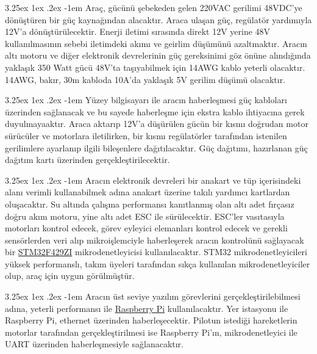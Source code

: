 \documentclass[12pt]{article}
\makeatletter
\newcounter{subsubsubsection}[subsubsection]
\renewcommand\paragraph{\@startsection{paragraph}{5}{\z@}%
  {3.25ex \@plus1ex \@minus.2ex}%
  {-1em}%
  {\normalfont\normalsize\bfseries}}
\makeatother
\begin{document}

\paragraph{} Araç, gücünü şebekeden gelen 220VAC gerilimi 48VDC'ye dönüştüren bir güç kaynağından alacaktır. Araca ulaşan güç, regülatör yardımıyla 12V'a dönüştürülecektir. Enerji iletimi sırasında direkt 12V yerine 48V kullanılmasının sebebi iletimdeki akımı ve geirlim düşümünü azaltmaktır. Aracın altı motoru ve diğer elektronik devrelerinin güç gereksinimi göz önüne alındığında yaklaşık 350 Watt gücü 48V'ta taşıyabilmek için 14AWG kablo yeterli olacaktır. 14AWG, bakır, 30m kabloda 10A'da yaklaşık 5V gerilim düşümü olacaktır. 

\paragraph{}Yüzey bilgisayarı ile aracın haberleşmesi güç kabloları üzerinden sağlanacak ve bu sayede haberleşme için ekstra kablo ihtiyacına gerek duyulmayaaktır. Araca aktarıp 12V'a düşürülen gücün bir kısmı doğrudan motor sürücüler ve motorlara iletilirken, bir kısmı regülatörler tarafından istenilen gerilimlere ayarlanıp ilgili bileşenlere dağıtılacaktır. Güç dağıtımı, hazırlanan güç dağıtım kartı üzerinden gerçekleştirilecektir.


\paragraph{} Aracın elektronik devreleri bir anakart ve tüp içerisindeki alanı verimli kullanabilmek adına anakart üzerine takılı yardımcı kartlardan oluşacaktır. Su altında çalışma performansı kanıtlanmış olan altı adet fırçasız doğru akım motoru, yine altı adet ESC ile sürülecektir. ESC'ler vasıtasıyla motorları kontrol edecek, görev eyleyici elemanları kontrol edecek ve gerekli sensörlerden veri alıp mikroişlemciyle haberleşerek aracın kontrolünü sağlayacak bir \href{https://www.st.com/en/microcontrollers-microprocessors/stm32f429zi.html}{STM32F429ZI} mikrodenetleyicisi kullanılacaktır. STM32 mikrodenetleyicileri yüksek performanslı, takım üyeleri tarafından sıkça kullanılan mikrodenetleyiciler olup, araç için uygun görülmüştür. 

\paragraph{} Aracın üst seviye yazılım görevlerini gerçekleştirilebilmesi adına, yeterli performansı ile \href{https://www.raspberrypi.org/products/raspberry-pi-3-model-b}{Raspberry Pi} kullanılacaktır. Yer istasyonu ile Raspberry Pi, ethernet üzerinden haberleşecektir. Pilotun istediği hareketlerin motorlar tarafından gerçekleştirilmesi ise Raspberry Pi'ın, mikrodenetleyici ile UART üzerinden haberleşmesiyle sağlanacaktır.
\end{document}
